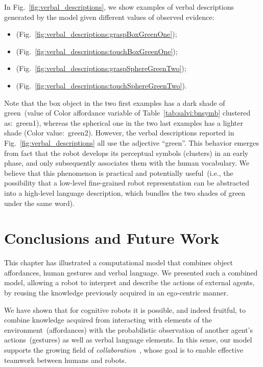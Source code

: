 In Fig.~\ref{fig:verbal_descriptions}, we show examples of verbal descriptions generated by the model given different values of observed evidence:
\begin{itemize}
\item \evidenceProducingGraspBoxGreenOne{} (Fig.~\ref{fig:verbal_descriptions:graspBoxGreenOne});

\item \evidenceProducingTouchBoxGreenOne{} (Fig.~\ref{fig:verbal_descriptions:touchBoxGreenOne});

\item \evidenceProducingGraspSphereGreenTwo{} (Fig.~\ref{fig:verbal_descriptions:graspSphereGreenTwo});

\item \evidenceProducingTouchSphereGreenTwo{} (Fig.~\ref{fig:verbal_descriptions:touchSphereGreenTwo}).
\end{itemize}
Note that the box object in the two first examples has a dark shade of green~(value of Color affordance variable of Table~\ref{tab:salvi:bnsymb} clustered as:~green1), whereas the spherical one in the two last examples has a lighter shade (Color value:~green2).
However, the verbal descriptions reported in Fig.~\ref{fig:verbal_descriptions} all use the adjective ``green''.
This behavior emerges from fact that the robot develops its perceptual symbols (clusters) in an early phase, and only subsequently associates them with the human vocabulary.
We believe that this phenomenon is practical and potentially useful~(i.e., the possibility that a low-level fine-grained robot representation can be abstracted into a high-level language description, which bundles the two shades of green under the same word).

\section{Conclusions and Future Work}
\label{sec:gestures:conclusions}

This chapter has illustrated a computational model that combines object affordances, human gestures and verbal language.
We presented such a combined model, allowing a robot to interpret and describe the actions of external agents, by reusing the knowledge previously acquired in an ego-centric manner.

We have shown that for cognitive robots it is possible, and indeed fruitful, to combine knowledge acquired from interacting with elements of the environment~(affordances) with the probabilistic observation of another agent's actions~(gestures) as well as verbal language elements.
In this sense, our model supports the growing field of \emph{\hr{} collaboration}~\cite{bauer:2008:ijhr,dragan:2015:hri}, whose goal is to enable effective teamwork between humans and robots.

